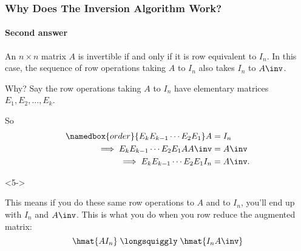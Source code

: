 \begin{frame}
\frametitle{Why Does The Inversion Algorithm Work?}
\framesubtitle{Second answer}

\vskip-3mm
\begin{thm}
  An $n\times n$ matrix $A$ is invertible if and only if it is row equivalent to
  $I_n$.
  \pause
  In this case, the sequence of row operations taking $A$ to $I_n$ also takes
  $I_n$ to $A\inv$.
\end{thm}

\pause\medskip
\alert{Why?}
Say the row operations taking $A$ to $I_n$ have elementary matrices
$E_1,E_2,\ldots,E_k$.
\begin{webonly}%
So
\[\begin{split}
  \namedbox{order}{E_kE_{k-1}\cdots E_2E_1} A &= I_n \\
\implies E_kE_{k-1}\cdots E_2E_1 AA\inv &= A\inv \\
\implies E_kE_{k-1}\cdots E_2E_1 I_n &= A\inv.
\end{split} \]
\begin{uncoverenv}<5->%
%
\end{uncoverenv}%
\end{webonly}%
\pause
This means if you do these same row operations to $A$ and to $I_n$, you'll end
up with $I_n$ and $A\inv$.  
\pause
This is what you do when you row reduce the augmented matrix:
\[ \hmat{A I_n} \;\longsquiggly\;\hmat{I_n A\inv} \]

\end{frame}


